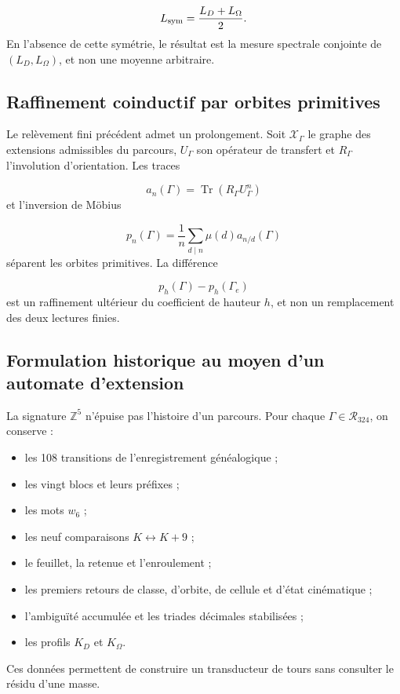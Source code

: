 \[
 L_{\rm sym}=\frac{L_D+L_\Omega}{2}.
\]
En l'absence de cette symétrie, le résultat est la mesure spectrale conjointe de \((L_D,L_\Omega)\), et non une moyenne arbitraire.

\subsection{Raffinement coinductif par orbites primitives}
Le relèvement fini précédent admet un prolongement. Soit \(\mathscr X_\Gamma\) le graphe des extensions admissibles du parcours, \(U_\Gamma\) son opérateur de transfert et \(R_\Gamma\) l'involution d'orientation. Les traces

\[
 a_n(\Gamma)=\operatorname{Tr}(R_\Gamma U_\Gamma^n)
\]
et l'inversion de Möbius

\[
 p_n(\Gamma)=\frac1n\sum_{d\mid n}\mu(d)a_{n/d}(\Gamma)
\]
séparent les orbites primitives. La différence

\[
 p_h(\Gamma)-p_h(\Gamma_e)
\]
est un raffinement ultérieur du coefficient de hauteur \(h\), et non un remplacement des deux lectures finies.

\subsection{Formulation historique au moyen d'un automate d'extension}
La signature \(\mathbb Z^5\) n'épuise pas l'histoire d'un parcours. Pour chaque \(\Gamma\in\mathcal R_{324}\), on conserve :

\begin{itemize}
\item les 108 transitions de l'enregistrement généalogique ;
\item les vingt blocs et leurs préfixes ;
\item les mots \(w_6\) ;
\item les neuf comparaisons \(K\leftrightarrow K+9\) ;
\item le feuillet, la retenue et l'enroulement ;
\item les premiers retours de classe, d'orbite, de cellule et d'état cinématique ;
\item l'ambiguïté accumulée et les triades décimales stabilisées ;
\item les profils \(K_D\) et \(K_\Omega\).
\end{itemize}
Ces données permettent de construire un transducteur de tours sans consulter le résidu d'une masse.

